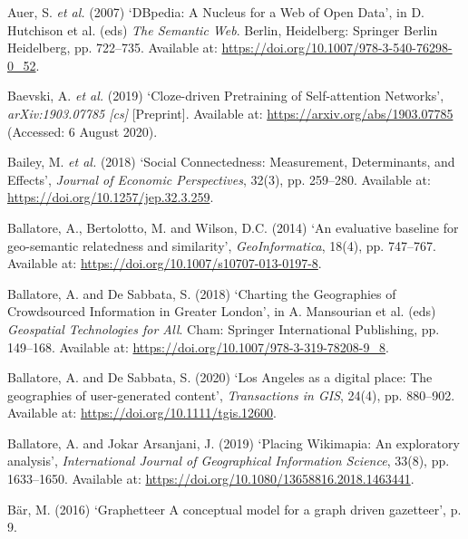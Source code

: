\documentclass[
  letterpaper,
  11pt,
  english,
  onehalfspacing,
  headsepline]{MastersDoctoralThesis}
\newlength{\cslhangindent}
\newlength{\cslentryspacingunit} %
\newenvironment{CSLReferences}[2] %
 {%
  \setlength{\parindent}{0pt}
  \ifodd #1
  \let\oldpar\par
  \def\par{\hangindent=\cslhangindent\oldpar}
  \fi
  \setlength{\parskip}{#2\cslentryspacingunit}
 }%
 {}
\begin{document}
\begin{CSLReferences}{0}{0}
\leavevmode{}%
Auer, S. \emph{et al.} (2007) {`{DBpedia}: {A Nucleus} for a {Web} of
{Open Data}'}, in D. Hutchison et al. (eds) \emph{The {Semantic Web}}.
{Berlin, Heidelberg}: {Springer Berlin Heidelberg}, pp. 722--735.
Available at: \url{https://doi.org/10.1007/978-3-540-76298-0_52}.

\leavevmode{}%
Baevski, A. \emph{et al.} (2019) {`Cloze-driven {Pretraining} of
{Self-attention Networks}'}, \emph{arXiv:1903.07785 {[}cs{]}}
{[}Preprint{]}. Available at: \url{https://arxiv.org/abs/1903.07785}
(Accessed: 6 August 2020).

\leavevmode{}%
Bailey, M. \emph{et al.} (2018) {`Social {Connectedness}: {Measurement},
{Determinants}, and {Effects}'}, \emph{Journal of Economic
Perspectives}, 32(3), pp. 259--280. Available at:
\url{https://doi.org/10.1257/jep.32.3.259}.

\leavevmode{}%
Ballatore, A., Bertolotto, M. and Wilson, D.C. (2014) {`An evaluative
baseline for geo-semantic relatedness and similarity'},
\emph{GeoInformatica}, 18(4), pp. 747--767. Available at:
\url{https://doi.org/10.1007/s10707-013-0197-8}.

\leavevmode{}%
Ballatore, A. and De Sabbata, S. (2018) {`Charting the {Geographies} of
{Crowdsourced Information} in {Greater London}'}, in A. Mansourian et
al. (eds) \emph{Geospatial {Technologies} for {All}}. {Cham}: {Springer
International Publishing}, pp. 149--168. Available at:
\url{https://doi.org/10.1007/978-3-319-78208-9_8}.

\leavevmode{}%
Ballatore, A. and De Sabbata, S. (2020) {`Los {Angeles} as a digital
place: {The} geographies of user-generated content'}, \emph{Transactions
in GIS}, 24(4), pp. 880--902. Available at:
\url{https://doi.org/10.1111/tgis.12600}.

\leavevmode{}%
Ballatore, A. and Jokar Arsanjani, J. (2019) {`Placing {Wikimapia}: An
exploratory analysis'}, \emph{International Journal of Geographical
Information Science}, 33(8), pp. 1633--1650. Available at:
\url{https://doi.org/10.1080/13658816.2018.1463441}.

\leavevmode{}%
Bär, M. (2016) {`Graphetteer {\textendash} {A} conceptual model for a
graph driven gazetteer'}, p. 9.


\end{CSLReferences}
\end{document}
